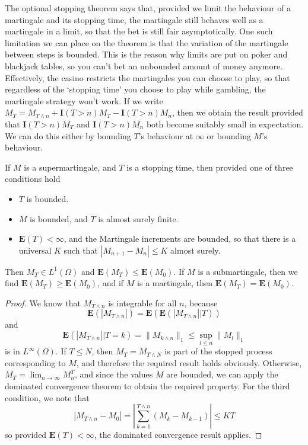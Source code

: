 The optional stopping theorem says that, provided we limit the behaviour of a martingale and its stopping time, the martingale still behaves well as a martingale in a limit, so that the bet is still fair asymptotically. One such limitation we can place on the theorem is that the variation of the martingale between steps is bounded. This is the reason why limits are put on poker and blackjack tables, so you can't bet an unbounded amount of money anymore. Effectively, the casino restricts the martingales you can choose to play, so that regardless of the `stopping time' you choose to play while gambling, the martingale strategy won't work. If we write $M_T = M_{T \wedge n} + \mathbf{I}(T > n) M_T - \mathbf{I}(T > n) M_n$, then we obtain the result provided that $\mathbf{I}(T > n) M_T$ and $\mathbf{I}(T > n) M_n$ both become suitably small in expectation. We can do this either by bounding $T$'s behaviour at $\infty$ or bounding $M$'s behaviour.

\begin{theorem}
    If $M$ is a supermartingale, and $T$ is a stopping time, then provided one of three conditions hold
    \begin{itemize}
        \item $T$ is bounded.
        \item $M$ is bounded, and $T$ is almost surely finite.
        \item $\mathbf{E}(T) < \infty$, and the Martingale increments are bounded, so that there is a universal $K$ such that $|M_{n+1} - M_n| \leq K$ almost surely.
    \end{itemize}
    Then $M_T \in L^1(\Omega)$ and $\mathbf{E}(M_T) \leq \mathbf{E}(M_0)$. If $M$ is a submartingale, then we find $\mathbf{E}(M_T) \geq \mathbf{E}(M_0)$, and if $M$ is a martingale, then $\mathbf{E}(M_T) = \mathbf{E}(M_0)$.
\end{theorem}
\begin{proof}
    We know that $M_{T \wedge n}$ is integrable for all $n$, because
    \[ \mathbf{E}(|M_{T \wedge n}|) = \mathbf{E}(\mathbf{E}(|M_{T \wedge n}| | T)) \]
    and
    \[ \mathbf{E}(|M_{T \wedge n}| | T = k) = \| M_{k \wedge n} \|_1 \leq \sup_{l \leq n} \| M_l \|_1 \]
    is in $L^\infty(\Omega)$. If $T \leq N$, then $M_T = M_{T \wedge N}$ is part of the stopped process corresponding to $M$, and therefore the required result holds obviously. Otherwise, $M_T = \lim_{n \to \infty} M^T_n$, and since the values $M$ are bounded, we can apply the dominated convergence theorem to obtain the required property. For the third condition, we note that
    \[ |M_{T \wedge n} - M_0| = \left| \sum_{k = 1}^{T \wedge n} (M_k - M_{k-1}) \right| \leq KT \]
    so provided $\mathbf{E}(T) < \infty$, the dominated convergence result applies.
\end{proof}

